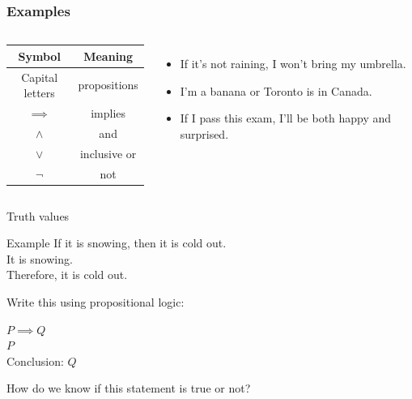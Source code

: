 \documentclass [aspectratio=169]{beamer}
\begin{document}
\begin{frame}\frametitle{Examples}
    \begin{columns}
        \begin{center}
          \begin{tabular}{|c|c|}
\hline
    Symbol & Meaning  \\
    \hline
     Capital letters & propositions  \\
     $\implies$ & implies \\
     $\wedge$ & and \\
     $\vee$ & inclusive or \\
     $\neg$ & not \\
     \hline
\end{tabular}
\end{center}
          \begin{itemize}
              \item If it's not raining, I won't bring my umbrella.
              \item I'm a banana or Toronto is in Canada.
              \item If I pass this exam, I'll be both happy and surprised.
          \end{itemize}
      \end{columns}
\end{frame}

\begin{frame}{Truth values}

\begin{exampleblock}{Example}
If it is snowing, then it is cold out. \\
It is snowing. \\
Therefore, it is cold out.  
\end{exampleblock}

Write this using propositional logic: \\

\pause
\begin{center}
$P \implies Q$ \\
$P$ \\
Conclusion: $Q$ \\
\end{center}

\vspace{1em}
How do we know if this statement is true or not?
\end{frame}
\end{document}
